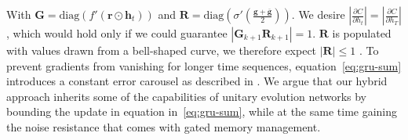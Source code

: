 \documentclass{article}
\begin{document}
With $\mathbf{G} = \text{diag} (f'(\mathbf{r} \odot \mathbf{h}_t))$ and $\mathbf{R} = \text{diag}(\sigma'(\frac{\mathbf{g} + \overline{\mathbf{g}}}{2}))$. We desire $|\frac{\partial C}{\partial h_t}| = |\frac{\partial C}{\partial h_T}|$, which would hold only if we could guarantee $|\mathbf{G}_{k+1} \mathbf{R}_{k+1}| = 1$. $\mathbf{R}$ is populated with values drawn from a bell-shaped curve, we therefore expect $|\mathbf{R}| \leq 1$ . To prevent gradients from vanishing for longer time sequences, equation~\ref{eq:gru-sum} introduces a constant error carousel as described in \cite{Hochreiter}. We argue that our hybrid approach inherits some of the capabilities of unitary evolution networks by bounding the update in equation in~\ref{eq:gru-sum}, while at the same time gaining the noise resistance that comes with gated memory management.\\
\end{document}
